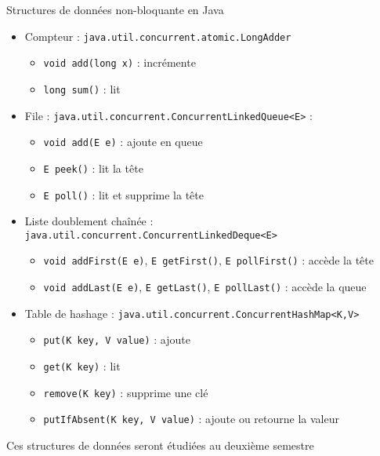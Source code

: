 
\begingroup

\begin{frame}{Structures de données non-bloquante en Java}
  \begin{itemize}
  \item Compteur : \lstinline{java.util.concurrent.atomic.LongAdder}
    \begin{itemize}
    \item \lstinline{void add(long x)} : incrémente
    \item \lstinline{long sum()} : lit
    \end{itemize}
  \item File : \lstinline{java.util.concurrent.ConcurrentLinkedQueue<E>} :
    \begin{itemize}
    \item \lstinline{void add(E e)} : ajoute en queue
    \item \lstinline{E peek()} : lit la tête
    \item \lstinline{E poll()} : lit et supprime la tête
    \end{itemize}
  \item Liste doublement chaînée : \lstinline{java.util.concurrent.ConcurrentLinkedDeque<E>}
    \begin{itemize}
    \item \lstinline{void addFirst(E e)}, \lstinline{E getFirst()}, \lstinline{E pollFirst()} : accède la tête
    \item \lstinline{void addLast(E e)}, \lstinline{E getLast()}, \lstinline{E pollLast()} : accède la queue
    \end{itemize}
  \item Table de hashage : \lstinline{java.util.concurrent.ConcurrentHashMap<K,V>}
    \begin{itemize}
    \item \lstinline{put(K key, V value)} : ajoute
    \item \lstinline{get(K key)} : lit
    \item \lstinline{remove(K key)} : supprime une clé
    \item \lstinline{putIfAbsent(K key, V value)} : ajoute ou retourne la valeur
    \end{itemize}
  \end{itemize}

  \vspace{3mm}
  Ces structures de données seront étudiées au deuxième semestre
  
\end{frame}

\endgroup
\endinput
